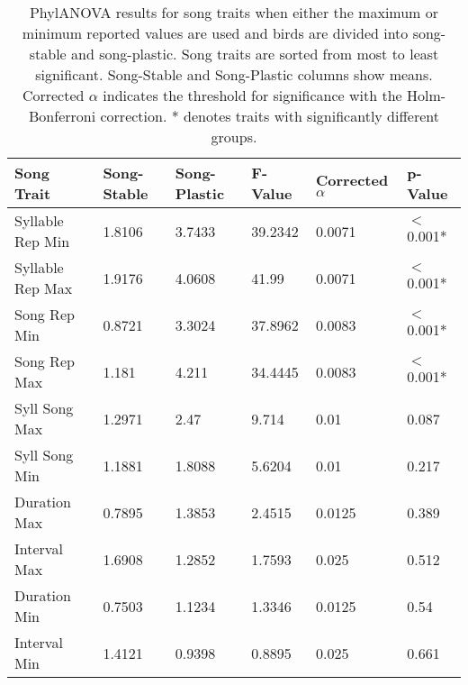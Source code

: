 \documentclass[a4paper,12pt]{article}
\begin{document}
\newcommand{\beginsupplement}{%
        \setcounter{table}{0}
        \renewcommand{\thetable}{S\arabic{table}}%
        \setcounter{figure}{0}
        \renewcommand{\thefigure}{S\arabic{figure}}%
     }

\beginsupplement





\begin{table}[ht]
\caption{PhylANOVA results for song traits when either the maximum or minimum reported values are used and birds are divided into song-stable and song-plastic. Song traits are sorted from most to least significant. Song-Stable and Song-Plastic columns show means. Corrected $\alpha$ indicates the threshold for significance with the Holm-Bonferroni correction. * denotes traits with significantly different groups.}
\centering
\begin{tabular}{llllll}
  \hline
Song Trait & Song-Stable & Song-Plastic & F-Value & Corrected $\alpha$ & p-Value \\ 
  \hline
Syllable Rep Min & 1.8106 & 3.7433 & 39.2342 & 0.0071 & $<$0.001* \\ 
  Syllable Rep Max & 1.9176 & 4.0608 & 41.99 & 0.0071 & $<$0.001* \\ 
  Song Rep Min & 0.8721 & 3.3024 & 37.8962 & 0.0083 & $<$0.001* \\ 
  Song Rep Max & 1.181 & 4.211 & 34.4445 & 0.0083 & $<$0.001* \\ 
  Syll Song Max & 1.2971 & 2.47 & 9.714 & 0.01 & 0.087 \\ 
  Syll Song Min & 1.1881 & 1.8088 & 5.6204 & 0.01 & 0.217 \\ 
  Duration Max & 0.7895 & 1.3853 & 2.4515 & 0.0125 & 0.389 \\ 
  Interval Max & 1.6908 & 1.2852 & 1.7593 & 0.025 & 0.512 \\ 
  Duration Min & 0.7503 & 1.1234 & 1.3346 & 0.0125 & 0.54 \\ 
  Interval Min & 1.4121 & 0.9398 & 0.8895 & 0.025 & 0.661 \\ 
   \hline
\end{tabular}
\end{table}
\end{document}
